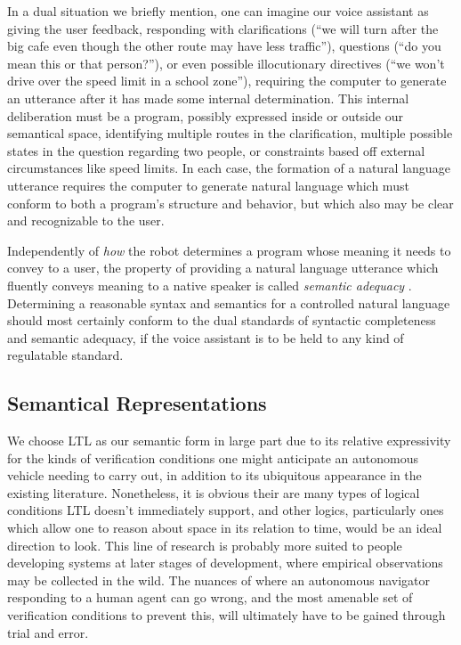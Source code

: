\documentclass[a4paper, 11pt]{article}
\begin{document}
In a dual situation we briefly mention, one can imagine our voice assistant as
giving the user feedback, responding with clarifications (``we will turn after
the big cafe even though the other route may have less traffic''), questions
(``do you mean this or that person?''), or even possible illocutionary
directives (``we won't drive over the speed limit in a school zone''), requiring
the computer to generate an utterance after it has made some internal
determination. This internal deliberation must be a program, possibly expressed
inside or outside our semantical space, identifying multiple routes in the
clarification, multiple possible states in the question regarding two people, or
constraints based off external circumstances like speed limits. In each case,
the formation of a natural language utterance requires the computer to generate
natural language which must conform to both a program's structure and behavior,
but which also may be clear and recognizable to the user.

Independently of \emph{how} the robot determines a program whose meaning it
needs to convey to a user, the property of providing a natural language
utterance which fluently conveys meaning to a native speaker is called
\emph{semantic adequacy} \cite{macmillan2021}. Determining a reasonable syntax
and semantics for a controlled natural language should most certainly conform to
the dual standards of syntactic completeness and semantic adequacy, if the voice
assistant is to be held to any kind of regulatable standard.

\subsection{Semantical Representations}

We choose LTL as our semantic form in large part due to its relative
expressivity for the kinds of verification conditions one might anticipate an
autonomous vehicle needing to carry out, in addition to its ubiquitous
appearance in the existing literature. Nonetheless, it is obvious their are many
types of logical conditions LTL doesn't immediately support, and other logics,
particularly ones which allow one to reason about space in its relation to time,
would be an ideal direction to look. This line of research is probably more
suited to people developing systems at later stages of development, where
empirical observations may be collected in the wild. The nuances of where an
autonomous navigator responding to a human agent can go wrong, and the most
amenable set of verification conditions to prevent this, will ultimately have to
be gained through trial and error.
\end{document}
